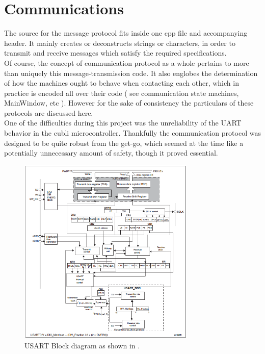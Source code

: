 \section{Communications}

The source for the message protocol fits inside one cpp file and accompanying header. It mainly creates or deconstructs strings or characters, in order to transmit and receive messages which satisfy the required specifications.\\

Of course, the concept of communication protocol as a whole pertains to more than uniquely this message-transmission code. It also englobes the determination of how the machines ought to behave when contacting each other, which in practice is encoded all over their code ( see communication state machines, MainWindow, etc ). However for the sake of consistency the particulars of these protocols are discussed here.\\

One of the difficulties during this project was the unreliability of the UART behavior in the cubli microcontroller. Thankfully the communication protocol was designed to be quite robust from the get-go, which seemed at the time like a potentially unnecessary amount of safety, though it proved essential.

\begin{figure}[ht]
   \centering
   \includegraphics[width=0.75\textwidth]{img/USART.png}
   \caption{USART Block diagram as shown in \cite{stm32manual}.}
   \label{img:USART}
\end{figure}

